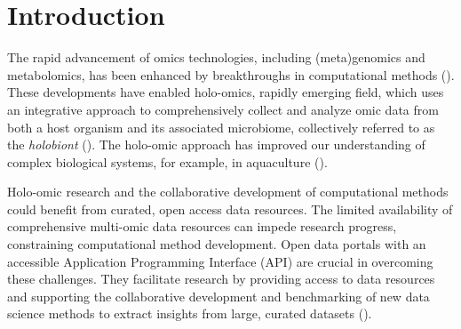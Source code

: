 \documentclass[unnumsec,webpdf,namedate,modern,large]{oup-authoring-template}%
\begin{document}

\maketitle

\section{Introduction}

The rapid advancement of omics technologies, including (meta)genomics and metabolomics, has been enhanced by breakthroughs in computational methods (\cite{moreno-indias_statistical_2021,marcos-zambrano_toolbox_2023,santamaria_bioinformatic_2024}).
These developments have enabled holo-omics, rapidly emerging field, which uses an integrative approach to comprehensively collect and analyze omic data from both a host organism and its associated microbiome, collectively referred to as the {\it holobiont} (\cite{nyholmHoloOmicsIntegratedHostMicrobiota2020,limborgAppliedHologenomicsFeasibility2018,odriozola_practical_2024}). The holo-omic approach has improved our understanding of complex biological systems, for example, in aquaculture (\cite{limborgAppliedHologenomicsFeasibility2018,atlantic_salmon}).



Holo-omic research and the collaborative development of computational methods could benefit from curated, open access data resources.
The limited availability of comprehensive multi-omic data resources can impede research progress, constraining computational method development. Open data portals with an accessible Application Programming Interface (API) are crucial in overcoming these challenges. They facilitate research by providing access to data resources and supporting the collaborative development and benchmarking of new data science methods to extract insights from large, curated datasets (\cite{pasolli_2017}).
\end{document}
